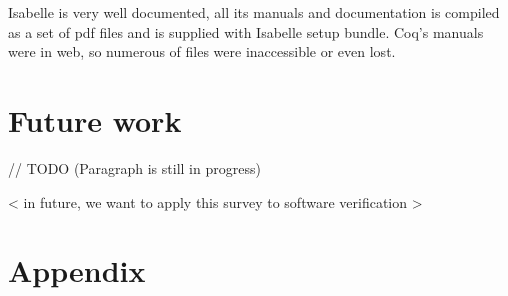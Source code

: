 \documentclass[article]{aaltoseries}
\begin{document}
Isabelle is very well documented, all its manuals and documentation is compiled as a set of pdf files and is supplied with Isabelle setup bundle. Coq's manuals were in web, so numerous of files were inaccessible or even lost.





\section{Future work}
\label{sec:future_work}

// TODO (Paragraph is still in progress)

< in future, we want to apply this survey to software verification >






\newpage
\appendix

\section{Appendix}
\end{document}
